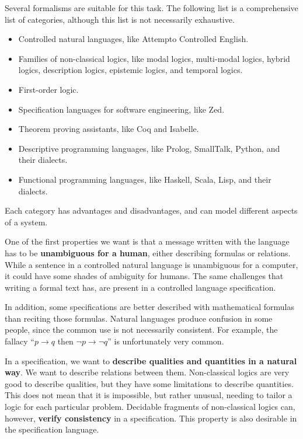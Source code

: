 Several formalisms are suitable for this task.
The following list is a comprehensive list of categories, although this list is not necessarily exhaustive.
\begin{itemize}
    \item Controlled natural languages, like Attempto Controlled English.
    \item Families of non-classical logics, like modal logics, multi-modal logics, hybrid logics, description logics, epistemic logics, and temporal logics.
    \item First-order logic.
    \item Specification languages for software engineering, like Zed.
    \item Theorem proving assistants, like Coq and Isabelle.
    \item Descriptive programming languages, like Prolog, SmallTalk, Python, and their dialects.
    \item Functional programming languages, like Haskell, Scala, Lisp, and their dialects.
\end{itemize}

Each category has advantages and disadvantages, and can model different aspects of a system.

One of the first properties we want is that a message written with the language has to be \textbf{unambiguous for a human}, either describing formulas or relations.
While a sentence in a controlled natural language is unambiguous for a computer, it could have some shades of ambiguity for humans.
The same challenges that writing a formal text has, are present in a controlled language specification.

In addition, some specifications are better described with mathematical formulas than reciting those formulas.
Natural languages produce confusion in some people, since the common use is not necessarily consistent.
For example, the fallacy ``$p \to q$ then $\lnot p \to \lnot q$'' is unfortunately very common.

In a specification, we want to \textbf{describe qualities and quantities in a natural way}.
We want to describe relations between them.
Non-classical logics are very good to describe qualities, but they have some limitations to describe quantities.
This does not mean that it is impossible, but rather unusual, needing to tailor a logic for each particular problem.
Decidable fragments of non-classical logics can, however, \textbf{verify consistency} in a specification.
This property is also desirable in the specification language.


